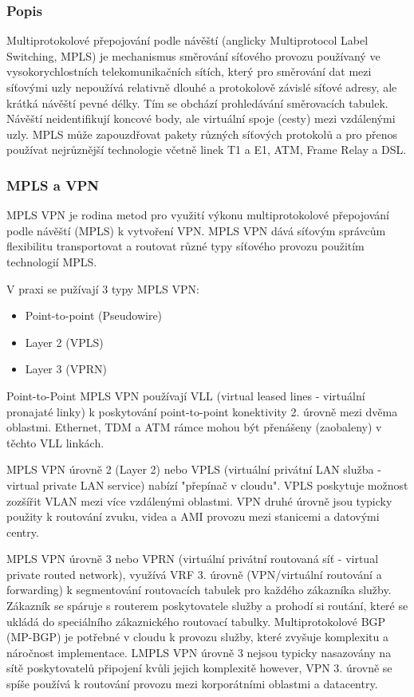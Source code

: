 \documentclass[thesis=B,czech]{FITthesis}[2012/06/26]
\begin{document}
      \subsubsection{Popis}

		  Multiprotokolové přepojování podle návěští (anglicky Multiprotocol Label Switching, MPLS) je mechanismus směrování síťového provozu používaný ve vysokorychlostních telekomunikačních sítích, který pro směrování dat mezi síťovými uzly nepoužívá relativně dlouhé a protokolově závislé síťové adresy, ale krátká návěští pevné délky.
		  Tím se obchází prohledávání směrovacích tabulek. Návěští neidentifikují koncové body, ale virtuální spoje (cesty) mezi vzdálenými uzly. MPLS může zapouzdřovat pakety různých síťových protokolů a pro přenos používat nejrůznější technologie včetně linek T1 a E1, ATM, Frame Relay a DSL.

      \subsubsection{MPLS a VPN}

		MPLS VPN je rodina metod pro využití výkonu multiprotokolové přepojování podle návěští (MPLS) k vytvoření VPN.
		MPLS VPN dává síťovým správcům flexibilitu transportovat a routovat různé typy síťového provozu použitím technologií MPLS.

		V praxi se pužívají 3 typy MPLS VPN:

		\begin{itemize}
		  \item Point-to-point (Pseudowire)
		  \item Layer 2 (VPLS)
		  \item Layer 3 (VPRN)
		\end{itemize}

		Point-to-Point MPLS VPN používají VLL (virtual leased lines - virtuální pronajaté linky) k poskytování point-to-point konektivity 2. úrovně mezi dvěma oblastmi. Ethernet, TDM a ATM rámce mohou být přenášeny (zaobaleny) v těchto VLL linkách.

		MPLS VPN úrovně 2 (Layer 2) nebo VPLS (virtuální privátní LAN služba - virtual private LAN service) nabízí "přepínač v cloudu". VPLS poskytuje možnost zozšířit VLAN mezi více vzdálenými oblastmi. VPN druhé úrovně jsou typicky použity k routování zvuku, videa a AMI provozu mezi stanicemi a datovými centry.

		MPLS VPN úrovně 3 nebo VPRN (virtuální privátní routovaná síť - virtual private routed network), využívá VRF 3. úrovně (VPN/virtuální routování a forwarding) k segmentování routovacích tabulek pro každého zákazníka služby.
		Zákazník se spáruje s routerem poskytovatele služby a prohodí si routání, které se ukládá do speciálního zákaznického routovací tabulky. Multiprotokolové BGP (MP-BGP) je potřebné v cloudu k provozu služby, které zvyšuje komplexitu a náročnost implementace.
		LMPLS VPN úrovně 3 nejsou typicky nasazovány na sítě poskytovatelů připojení kvůli jejich komplexitě however, VPN 3. úrovně se spíše používá k routování provozu mezi korporátními oblastmi a datacentry.
		\cite{mpls_rfc}\cite{mpls_guide}
\end{document}

